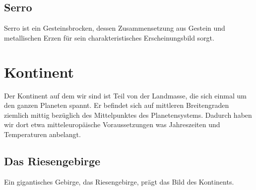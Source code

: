 \subsection{Serro} \label{sec:mond}
Serro ist ein Gesteinsbrocken, dessen Zusammensetzung aus Gestein und metallischen Erzen für sein charakteristisches Erscheinungsbild sorgt.



\section{Kontinent}
Der Kontinent auf dem wir sind ist Teil von der Landmasse, die sich einmal um den ganzen Planeten spannt.
Er befindet sich auf mittleren Breitengraden ziemlich mittig bezüglich des Mittelpunktes des Planetensystems.
Dadurch haben wir dort etwa mitteleuropäische Voraussetzungen was Jahreszeiten und Temperaturen anbelangt.

\subsection{Das Riesengebirge}
Ein gigantisches Gebirge, das Riesengebirge, prägt das Bild des Kontinents.

